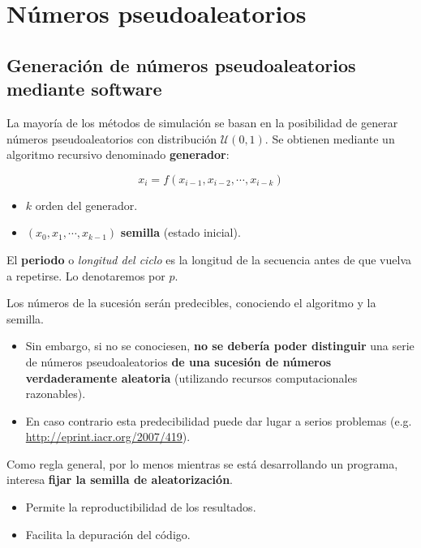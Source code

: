 \documentclass[]{book}
\theoremstyle{definition}
\theoremstyle{definition}
\theoremstyle{definition}
\theoremstyle{remark}
\begin{document}
\section{Números pseudoaleatorios}\label{numeros-pseudoaleatorios}

\subsection{Generación de números pseudoaleatorios mediante
software}\label{generacion-de-numeros-pseudoaleatorios-mediante-software}

La mayoría de los métodos de simulación se basan en la posibilidad de
generar números pseudoaleatorios con distribución \(\mathcal{U}(0,1)\).
Se obtienen mediante un algoritmo recursivo denominado
\textbf{generador}:

\[x_{i}=f\left(  x_{i-1},x_{i-2},\cdots,x_{i-k}\right)\]

\begin{itemize}
\item
  \(k\) orden del generador.
\item
  \(\left( x_{0},x_{1},\cdots,x_{k-1}\right)\) \textbf{semilla} (estado
  inicial).
\end{itemize}

El \textbf{periodo} o \emph{longitud del ciclo} es la longitud de la
secuencia antes de que vuelva a repetirse. Lo denotaremos por \(p\).

Los números de la sucesión serán predecibles, conociendo el algoritmo y
la semilla.

\begin{itemize}
\item
  Sin embargo, si no se conociesen, \textbf{no se debería poder
  distinguir} una serie de números pseudoaleatorios \textbf{de una
  sucesión de números verdaderamente aleatoria} (utilizando recursos
  computacionales razonables).
\item
  En caso contrario esta predecibilidad puede dar lugar a serios
  problemas (e.g. \url{http://eprint.iacr.org/2007/419}).
\end{itemize}

Como regla general, por lo menos mientras se está desarrollando un
programa, interesa \textbf{fijar la semilla de aleatorización}.

\begin{itemize}
\item
  Permite la reproductibilidad de los resultados.
\item
  Facilita la depuración del código.
\end{itemize}
\end{document}
